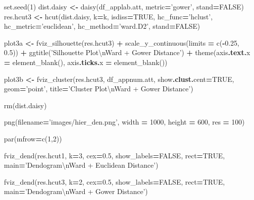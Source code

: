 \documentclass[]{article}
\newenvironment{Shaded}{\begin{snugshade}}{\end{snugshade}}
\newcommand{\KeywordTok}[1]{\textcolor[rgb]{0.13,0.29,0.53}{\textbf{{#1}}}}
\newcommand{\DecValTok}[1]{\textcolor[rgb]{0.00,0.00,0.81}{{#1}}}
\newcommand{\FloatTok}[1]{\textcolor[rgb]{0.00,0.00,0.81}{{#1}}}
\newcommand{\StringTok}[1]{\textcolor[rgb]{0.31,0.60,0.02}{{#1}}}
\newcommand{\NormalTok}[1]{{#1}}
\begin{document}
\begin{Shaded}
\begin{Highlighting}[]
\NormalTok{set.seed(}\DecValTok{1}\NormalTok{)}
\NormalTok{dist.daisy }\KeywordTok{<-} \NormalTok{daisy(df_applab.att, metric}\KeywordTok{=}\StringTok{'gower'}\NormalTok{, stand}\KeywordTok{=}\NormalTok{FALSE)}
\NormalTok{res.hcut3 }\KeywordTok{<-} \NormalTok{hcut(dist.daisy, k}\KeywordTok{=}\NormalTok{k, isdiss}\KeywordTok{=}\NormalTok{TRUE,}
                  \NormalTok{hc_func}\KeywordTok{=}\StringTok{'hclust'}\NormalTok{, hc_metric}\KeywordTok{=}\StringTok{'euclidean'}\NormalTok{,}
                  \NormalTok{hc_method}\KeywordTok{=}\StringTok{'ward.D2'}\NormalTok{, stand}\KeywordTok{=}\NormalTok{FALSE)}

\NormalTok{plot3a }\KeywordTok{<-} \NormalTok{fviz_silhouette(res.hcut3) }\KeywordTok{+}
  \NormalTok{scale_y_continuous(limits }\KeywordTok{=} \NormalTok{c(}\KeywordTok{-}\FloatTok{0.25}\NormalTok{, }\FloatTok{0.5}\NormalTok{)) }\KeywordTok{+}
  \NormalTok{ggtitle(}\StringTok{'Silhouette Plot\textbackslash{}nWard + Gower Distance'}\NormalTok{) }\KeywordTok{+}
  \NormalTok{theme(axis}\KeywordTok{.text.}\NormalTok{x }\KeywordTok{=} \NormalTok{element_blank(), axis}\KeywordTok{.ticks.}\NormalTok{x }\KeywordTok{=} \NormalTok{element_blank())}

\NormalTok{plot3b }\KeywordTok{<-} \NormalTok{fviz_cluster(res.hcut3, df_appnum.att, }
                      \NormalTok{show}\KeywordTok{.clust.}\NormalTok{cent}\KeywordTok{=}\NormalTok{TRUE, geom}\KeywordTok{=}\StringTok{'point'}\NormalTok{,}
                      \NormalTok{title}\KeywordTok{=}\StringTok{'Cluster Plot\textbackslash{}nWard + Gower Distance'}\NormalTok{)}

\NormalTok{rm(dist.daisy)}


\NormalTok{png(filename}\KeywordTok{=}\StringTok{'images/hier_den.png'}\NormalTok{, }
    \NormalTok{width }\KeywordTok{=} \DecValTok{1000}\NormalTok{, height }\KeywordTok{=} \DecValTok{600}\NormalTok{, res }\KeywordTok{=} \DecValTok{100}\NormalTok{)}

\NormalTok{par(mfrow}\KeywordTok{=}\NormalTok{c(}\DecValTok{1}\NormalTok{,}\DecValTok{2}\NormalTok{))}

\NormalTok{fviz_dend(res.hcut1, k}\KeywordTok{=}\DecValTok{3}\NormalTok{, }
          \NormalTok{cex}\KeywordTok{=}\FloatTok{0.5}\NormalTok{, show_labels}\KeywordTok{=}\NormalTok{FALSE, rect}\KeywordTok{=}\NormalTok{TRUE,}
          \NormalTok{main}\KeywordTok{=}\StringTok{'Dendogram\textbackslash{}nWard + Euclidean Distance'}\NormalTok{)}

\NormalTok{fviz_dend(res.hcut3, k}\KeywordTok{=}\DecValTok{2}\NormalTok{,}
          \NormalTok{cex}\KeywordTok{=}\FloatTok{0.5}\NormalTok{, show_labels}\KeywordTok{=}\NormalTok{FALSE, rect}\KeywordTok{=}\NormalTok{TRUE,}
          \NormalTok{main}\KeywordTok{=}\StringTok{'Dendogram\textbackslash{}nWard + Gower Distance'}\NormalTok{)}


\end{Highlighting}
\end{Shaded}
\end{document}

